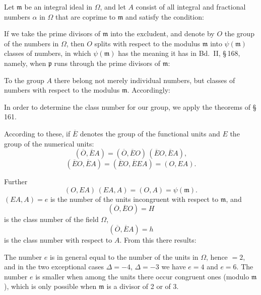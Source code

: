 Let $\mathfrak{m}$ be an integral ideal in $\Omega$, and let $A$ consist of all integral and fractional numbers $\alpha$ in $\Omega$ that are coprime to $\mathfrak{m}$ and satisfy the condition:

If we take the prime divisors of $\mathfrak{m}$ into the excludent, and denote by $O$ the group of the numbers in $\Omega$, then $O$ splits with respect to the modulus $\mathfrak{m}$ into $\psi(\mathfrak{m})$ classes of numbers, in which $\psi(\mathfrak{m})$ has the meaning it has in Bd.\ II, \S\,168, namely, when $\mathfrak{p}$ runs through the prime divisors of $\mathfrak{m}$:

To the group $A$ there belong not merely individual numbers, but classes of numbers with respect to the modulus $\mathfrak{m}$. Accordingly:

In order to determine the class number for our group, we apply the theorems of \S\,161.

According to these, if $\overline{E}$ denotes the group of the functional units and $E$ the group of the numerical units:
\[
(\overline{O}, \overline{E}A) = (\overline{O}, \overline{E}O)\,(\overline{E}O, \overline{E}A),
\]
\[
(\overline{E}O, \overline{E}A) = (\overline{E}O, \overline{E}EA) = (O, EA).
\]

Further
\[
(O, EA)\,(EA, A) = (O, A) = \psi(\mathfrak{m}).
\]
$(EA, A) = e$ is the number of the units incongruent with respect to $\mathfrak{m}$, and
\[
(\overline{O}, \overline{E}O) = H
\]
is the class number of the field $\Omega$,
\[
(\overline{O}, \overline{E}A) = h
\]
is the class number with respect to $A$. From this there results:

The number $e$ is in general equal to the number of the units in $\Omega$, hence $= 2$, and in the two exceptional cases $\Delta = -4$, $\Delta = -3$ we have $e = 4$ and $e = 6$. The number $e$ is smaller when among the units there occur congruent ones (modulo $\mathfrak{m}$), which is only possible when $\mathfrak{m}$ is a divisor of 2 or of 3.
